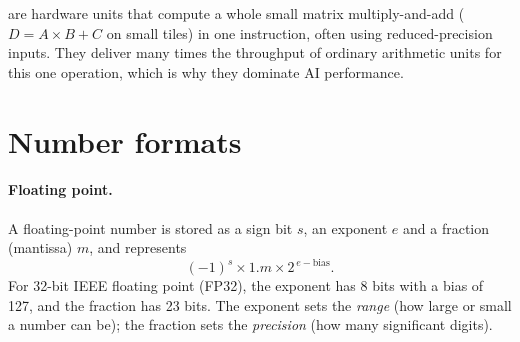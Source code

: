  are hardware units that compute a whole small matrix multiply-and-add ($D = A \times B + C$ on small tiles) in one instruction, often using reduced-precision inputs. They deliver many times the throughput of ordinary arithmetic units for this one operation, which is why they dominate AI performance.

\section{Number formats}

\paragraph{Floating point.} A floating-point number is stored as a sign bit $s$, an exponent $e$ and a fraction (mantissa) $m$, and represents
\[
  (-1)^s \times 1.m \times 2^{\,e - \text{bias}}.
\]
For 32-bit IEEE floating point (FP32), the exponent has 8 bits with a bias of 127, and the fraction has 23 bits. The exponent sets the \emph{range} (how large or small a number can be); the fraction sets the \emph{precision} (how many significant digits).

